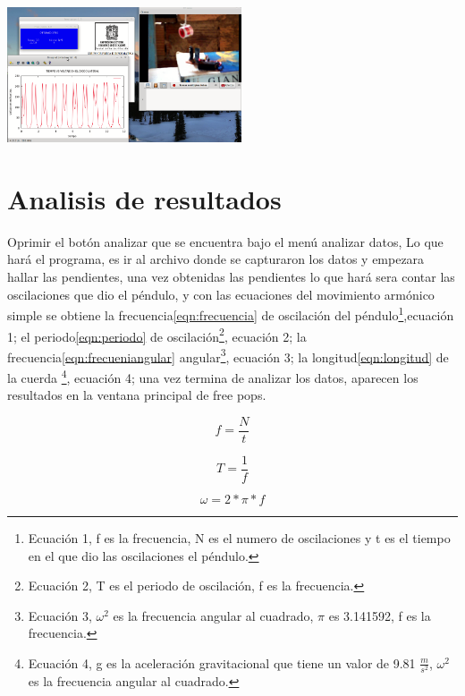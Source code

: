 \documentclass[12pt]{article}
\newenvironment{Figure}
{\par\medskip\noindent\minipage{\linewidth}}
{\endminipage\par\medskip}
\begin{document}
\begin{multicols}{2}
\begin{Figure}
\center
\includegraphics[width=9.cm, height=4cm]{fig/graf1.png}
\label{fig:g13}
\end{Figure}

\section{Analisis de resultados}
Oprimir el botón analizar que se encuentra bajo el menú analizar datos, Lo que hará el programa, es ir al archivo donde se capturaron los datos y empezara hallar las pendientes, una vez obtenidas las pendientes lo que hará sera contar las oscilaciones que dio el péndulo,  y con las ecuaciones\cite{GIANCOLI} del movimiento armónico simple se obtiene  la frecuencia\ref{eqn:frecuencia}  de oscilación del péndulo\footnote{ Ecuación 1, f es la frecuencia, N es el numero de oscilaciones y t es el tiempo en el que dio las oscilaciones el péndulo.},ecuación 1; el periodo\ref{eqn:periodo} de oscilación\footnote{Ecuación 2, T es el periodo de oscilación, f es la frecuencia.}, ecuación 2; la frecuencia\ref{eqn:frecueniangular} angular\footnote{ Ecuación 3, $\omega^2$ es la frecuencia angular al cuadrado, $\pi $ es 3.141592, f es la frecuencia.}, ecuación 3; la longitud\ref{eqn:longitud} de la cuerda \footnote{ Ecuación 4, g es la aceleración gravitacional que tiene un valor de 9.81 $\frac{m}{s^2}$, $\omega^2$ es la frecuencia angular al cuadrado.}, ecuación 4; una vez termina de analizar los datos, aparecen los resultados en la ventana principal de free pops.

\begin{equation}
\label{eqn:frecuencia}
f = \frac{N}{t}
\end{equation}

\begin{equation}
\label{eqn:periodo}
T = \frac{1}{f}
\end{equation}

\begin{equation}
\label{eqn:frecueniangular}
\omega = 2 * \pi * f
\end{equation}


\end{multicols}
\end{document}
